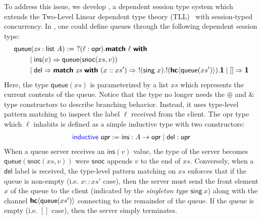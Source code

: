 To address this issue, we develop \TLLC{}, a dependent session type system which
extends the Two-Level Linear dependent type theory (TLL)~\cite{fu25} with
session-typed concurrency. In \TLLC{}, one could define queues through the following
dependent session type:
\begin{alignat*}{2}
  &\textsf{queue} (\textit{xs} : \textsf{list}\ A) :=\ ?(\ell : \textsf{opr}). \textbf{\textsf{match}}\ \ell\ \textbf{\textsf{with}} \\
  &\qquad\mid \textsf{ins}(v) \Rightarrow \textsf{queue}(\textsf{snoc}(xs, v)) \\
  &\qquad\mid \textsf{del} \Rightarrow
    \textbf{\textsf{match}}\ \textit{xs}\ \textbf{\textsf{with}}
    \ (x :: xs') \Rightarrow\ !(\textsf{sing}\ x). !({\textbf{\textsf{hc}}\langle{\textsf{queue}(xs')}\rangle}). \textbf{\textsf{1}}
    \mid [] \Rightarrow \textbf{\textsf{1}}
\end{alignat*}
Here, the type $\textsf{queue}(\textit{xs})$ is parameterized by a list $\textit{xs}$
which represents the current contents of the queue. Notice that the type no longer needs
the $\oplus$ and $\&$ type constructors to describe branching behavior. Instead, it uses
type-level pattern matching to inspect the label $\ell$ received from the client.
The \textsf{opr} type which $\ell$ inhabits is defined as a simple inductive type with
two constructors:
\begin{align*}
  \textsf{\color{blue}inductive}\ \textsf{opr} := \textsf{ins}: A \rightarrow \textsf{opr} \mid \textsf{del}: \textsf{opr}
\end{align*}
When a queue server receives an $\textsf{ins}(v)$ value, the type of the server becomes
$\textsf{queue}(\textsf{snoc}(xs, v))$ were $\textsf{snoc}$ appends $v$ to the end of $xs$.
Conversely, when a $\textsf{del}$ label is received, the type-level pattern matching on $xs$
enforces that if the queue is non-empty (i.e. $x :: xs'$ case), then the server must send
the front element $x$ of the queue to the client (indicated by the \emph{singleton type}
$\textsf{sing}\ x$) along with the channel ${\textbf{\textsf{hc}}\langle{\textsf{queue}(xs')}\rangle}$ connecting to the remainder
of the queue. If the queue is empty (i.e. $[]$ case), then the server simply terminates.


